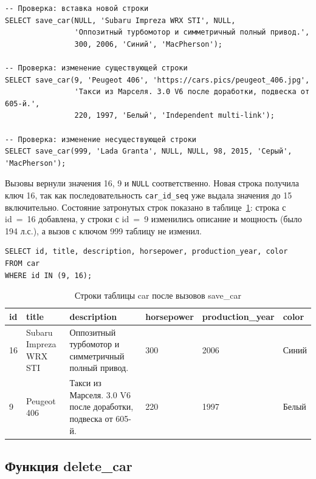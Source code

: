 \documentclass[oneside,a4paper,14pt]{extarticle}
\begin{document}
\begin{verbatim}
-- Проверка: вставка новой строки
SELECT save_car(NULL, 'Subaru Impreza WRX STI', NULL,
                'Оппозитный турбомотор и симметричный полный привод.',
                300, 2006, 'Синий', 'MacPherson');

-- Проверка: изменение существующей строки
SELECT save_car(9, 'Peugeot 406', 'https://cars.pics/peugeot_406.jpg',
                'Такси из Марселя. 3.0 V6 после доработки, подвеска от 605-й.',
                220, 1997, 'Белый', 'Independent multi-link');

-- Проверка: изменение несуществующей строки
SELECT save_car(999, 'Lada Granta', NULL, NULL, 98, 2015, 'Серый', 'MacPherson');
\end{verbatim}

Вызовы вернули значения 16, 9 и \texttt{NULL} соответственно. Новая строка получила ключ 16, так как последовательность \texttt{car\_id\_seq} уже выдала значения до 15 включительно. Состояние затронутых строк показано в таблице~\ref{tab:save}: строка с id~=~16 добавлена, у строки с id~=~9 изменились описание и мощность (было 194 л.с.), а вызов с ключом 999 таблицу не изменил.

\begin{verbatim}
SELECT id, title, description, horsepower, production_year, color
FROM car
WHERE id IN (9, 16);
\end{verbatim}

\begin{table}[H]
\centering
\footnotesize
\setlength{\tabcolsep}{3pt}
\caption{Строки таблицы car после вызовов save\_car}\label{tab:save}
\begin{tabular}{|l|>{\raggedright\arraybackslash}p{30mm}|>{\raggedright\arraybackslash}p{50mm}|l|l|l|}
\hline
\textbf{id} & \textbf{title} & \textbf{description} & \textbf{horsepower} & \textbf{production\_\allowbreak year} & \textbf{color} \\ \hline
16 & Subaru Impreza WRX STI & Оппозитный турбомотор и симметричный полный привод. & 300 & 2006 & Синий \\ \hline
9 & Peugeot 406 & Такси из Марселя. 3.0 V6 после доработки, подвеска от 605-й. & 220 & 1997 & Белый \\ \hline
\end{tabular}
\end{table}

\subsection{Функция delete\_car}
\end{document}
